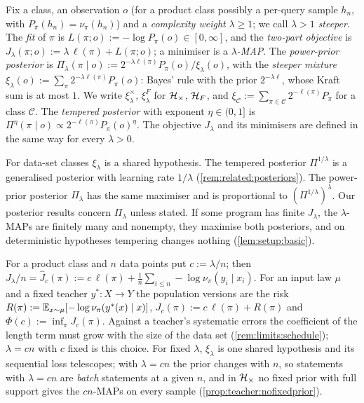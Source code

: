 \begin{definition}\label{def:setup:objectives}
Fix a class, an observation $o$ (for a product class possibly a per-query sample $h_n$, with $P_\pi(h_n)=\nu_\pi(h_n)$) and a \emph{complexity weight} $\lambda\ge1$; we call $\lambda>1$ \emph{steeper}. The \emph{fit} of $\pi$ is $L(\pi;o):=-\log P_\pi(o)\in[0,\infty]$, and the \emph{two-part objective} is $J_\lambda(\pi;o):=\lambda\,\ell(\pi)+L(\pi;o)$; a minimiser is a \emph{$\lambda$-MAP}. The \emph{power-prior posterior} is $\Pi_\lambda(\pi\mid o):=2^{-\lambda\ell(\pi)}P_\pi(o)/\xi_\lambda(o)$, with the \emph{steeper mixture} $\xi_\lambda(o):=\sum_\pi2^{-\lambda\ell(\pi)}P_\pi(o)$: Bayes' rule with the prior $2^{-\lambda\ell}$, whose Kraft sum is at most $1$. We write $\xi^\times_\lambda$, $\xi^F_\lambda$ for $\mathcal{H}_{\times}$, $\mathcal{H}_{F}$, and $\xi_{\mathcal C}:=\sum_{\pi\in\mathcal C}2^{-\ell(\pi)}P_\pi$ for a class $\mathcal C$. The \emph{tempered posterior} with exponent $\eta\in(0,1]$ is $\Pi^\eta(\pi\mid o)\propto2^{-\ell(\pi)}P_\pi(o)^\eta$. The objective $J_\lambda$ and its minimisers are defined in the same way for every $\lambda>0$.
\end{definition}

For data-set classes $\xi_\lambda$ is a shared hypothesis. The tempered posterior $\Pi^{1/\lambda}$ is a generalised posterior with learning rate $1/\lambda$ (\cref{rem:related:posteriors}). The power-prior posterior $\Pi_\lambda$ has the same maximiser and is proportional to $(\Pi^{1/\lambda})^\lambda$. Our posterior results concern $\Pi_\lambda$ unless stated. If some program has finite $J_\lambda$, the $\lambda$-MAPs are finitely many and nonempty, they maximise both posteriors, and on deterministic hypotheses tempering changes nothing (\cref{lem:setup:basic}).

\begin{remark}[Per-sample form; $\lambda=cn$ gives batch objectives]\label{rem:setup:persample}
For a product class and $n$ data points put $c:=\lambda/n$; then $J_\lambda/n=\hat J_c(\pi):=c\,\ell(\pi)+\frac1n\sum_{i\le n}-\log\nu_\pi(y_i\mid x_i)$. For an input law $\mu$ and a fixed teacher $y^*:X\to Y$ the population versions are the risk $R(\pi):=\mathbb{E}_{x\sim\mu}[-\log\nu_\pi(y^*(x)\mid x)]$, $J_c(\pi):=c\,\ell(\pi)+R(\pi)$ and $\Phi(c):=\inf_\pi J_c(\pi)$. Against a teacher's systematic errors the coefficient of the length term must grow with the size of the data set (\cref{rem:limits:schedule}); $\lambda=cn$ with $c$ fixed is this choice. For fixed $\lambda$, $\xi_\lambda$ is one shared hypothesis and its sequential loss telescopes; with $\lambda=cn$ the prior changes with $n$, so statements with $\lambda=cn$ are \emph{batch} statements at a given $n$, and in $\mathcal{H}_{\times}$ no fixed prior with full support gives the $cn$-MAPs on every sample (\cref{prop:teacher:nofixedprior}).
\end{remark}

